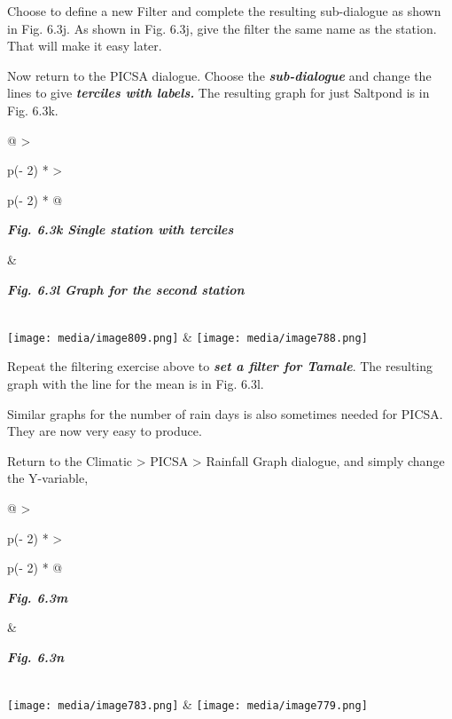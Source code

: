 \documentclass[
  letterpaper,
  DIV=11,
  numbers=noendperiod]{scrreprt}
\begin{document}
Choose to define a new Filter and complete the resulting sub-dialogue as
shown in Fig. 6.3j. As shown in Fig. 6.3j, give the filter the same name
as the station. That will make it easy later.

Now return to the PICSA dialogue. Choose the
\textbf{\emph{sub-dialogue}} and change the lines to give
\textbf{\emph{terciles with labels.}} The resulting graph for just
Saltpond is in Fig. 6.3k.

\begin{longtable}[]{@{}
  >{\raggedright\arraybackslash}p{(\columnwidth - 2\tabcolsep) * }
  >{\raggedright\arraybackslash}p{(\columnwidth - 2\tabcolsep) * }@{}}
\toprule\noalign{}
\begin{minipage}[b]{\linewidth}\raggedright
\textbf{\emph{Fig. 6.3k Single station with terciles}}
\end{minipage} & \begin{minipage}[b]{\linewidth}\raggedright
\textbf{\emph{Fig. 6.3l Graph for the second station}}
\end{minipage} \\
\midrule\noalign{}
\endhead
\bottomrule\noalign{}
\endlastfoot
\texttt{[image: media/image809.png]} &
\texttt{[image: media/image788.png]} \\
\end{longtable}

Repeat the filtering exercise above to \textbf{\emph{set a filter for
Tamale}}. The resulting graph with the line for the mean is in Fig.
6.3l.

Similar graphs for the number of rain days is also sometimes needed for
PICSA. They are now very easy to produce.

Return to the Climatic \textgreater{} PICSA \textgreater{} Rainfall
Graph dialogue, and simply change the Y-variable,

\begin{longtable}[]{@{}
  >{\raggedright\arraybackslash}p{(\columnwidth - 2\tabcolsep) * }
  >{\raggedright\arraybackslash}p{(\columnwidth - 2\tabcolsep) * }@{}}
\toprule\noalign{}
\begin{minipage}[b]{\linewidth}\raggedright
\textbf{\emph{Fig. 6.3m}}
\end{minipage} & \begin{minipage}[b]{\linewidth}\raggedright
\textbf{\emph{Fig. 6.3n}}
\end{minipage} \\
\midrule\noalign{}
\endhead
\bottomrule\noalign{}
\endlastfoot
\texttt{[image: media/image783.png]} &
\texttt{[image: media/image779.png]} \\
\end{longtable}
\end{document}
